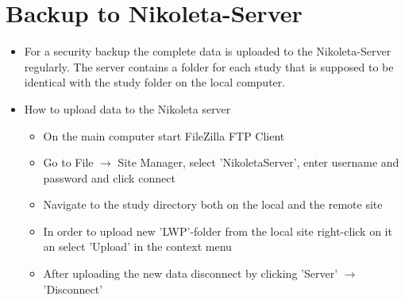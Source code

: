 \documentclass[11pt]{article}
\begin{document}
\section{Backup to Nikoleta-Server}
\begin{itemize}
\item For a security backup the complete data is uploaded to the Nikoleta-Server regularly. The server contains a folder for each study   that is supposed to be identical with the study folder on the local computer.
\item How to upload data to the Nikoleta server
\begin{itemize}
	\item On the main computer start FileZilla FTP Client
	\item Go to File $\rightarrow$ Site Manager, select 'NikoletaServer', enter username and password and click connect
	\item Navigate to the study directory both on the local and the remote site
	\item In order to upload new 'LWP'-folder from the local site right-click on it an select 'Upload' in the context menu
	\item After uploading the new data disconnect by clicking 'Server' $\rightarrow$ 'Disconnect'
\end{itemize}
\end{itemize}
\end{document}
